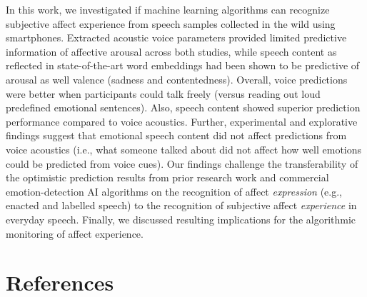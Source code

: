 \documentclass[
  man,floatsintext]{apa6}
\begin{document}
In this work, we investigated if machine learning algorithms can recognize subjective affect experience from speech samples collected in the wild using smartphones. Extracted acoustic voice parameters provided limited predictive information of affective arousal across both studies, while speech content as reflected in state-of-the-art word embeddings had been shown to be predictive of arousal as well valence (sadness and contentedness). Overall, voice predictions were better when participants could talk freely (versus reading out loud predefined emotional sentences). Also, speech content showed superior prediction performance compared to voice acoustics. Further, experimental and explorative findings suggest that emotional speech content did not affect predictions from voice acoustics (i.e., what someone talked about did not affect how well emotions could be predicted from voice cues). Our findings challenge the transferability of the optimistic prediction results from prior research work and commercial emotion-detection AI algorithms on the recognition of affect \emph{expression} (e.g., enacted and labelled speech) to the recognition of subjective affect \emph{experience} in everyday speech. Finally, we discussed resulting implications for the algorithmic monitoring of affect experience.

\newpage

\hypertarget{references}{%
\section{References}\label{references}}
\end{document}
